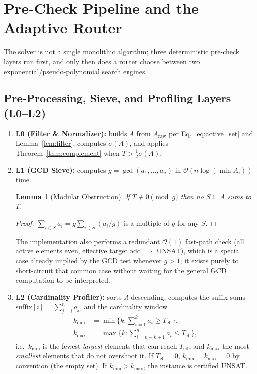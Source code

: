 \documentclass[journal,onecolumn,11pt]{IEEEtran}
\newtheorem{lemma}{Lemma}
\begin{document}
\section{Pre-Check Pipeline and the Adaptive Router}
\label{sec:architecture}

The solver is not a single monolithic algorithm; three deterministic pre-check layers run first, and only then does a router choose between two exponential/pseudo-polynomial search engines.

\subsection{Pre-Processing, Sieve, and Profiling Layers (L0--L2)}
\begin{enumerate}
    \item \textbf{L0 (Filter \& Normalizer):} builds $A$ from $A_{\text{raw}}$ per Eq.~\eqref{eq:active_set} and Lemma~\ref{lem:filter}, computes $\sigma(A)$, and applies Theorem~\ref{thm:complement} when $T > \tfrac12\sigma(A)$.
    \item \textbf{L1 (GCD Sieve):} computes $g=\gcd(a_1,\dots,a_n)$ in $\mathcal{O}(n\log(\min A_i))$ time.
    \begin{lemma}[Modular Obstruction]
    If $T \not\equiv 0 \pmod g$ then no $S \subseteq A$ sums to $T$.
    \end{lemma}
    \begin{proof}
    $\sum_{i\in S} a_i = g\sum_{i\in S}(a_i/g)$ is a multiple of $g$ for any $S$.
    \end{proof}
    The implementation also performs a redundant $\mathcal{O}(1)$ fast-path check (all active elements even, effective target odd $\Rightarrow$ UNSAT), which is a special case already implied by the GCD test whenever $g>1$; it exists purely to short-circuit that common case without waiting for the general GCD computation to be interpreted.
    \item \textbf{L2 (Cardinality Profiler):} sorts $A$ descending, computes the suffix sums $\text{suffix}[i]=\sum_{j=i}^{n} a_j$, and the cardinality window
    \begin{align}
        k_{\min} &= \min\Big\{k : \textstyle\sum_{i=1}^k a_i \ge T_{\text{eff}}\Big\}, \\
        k_{\max} &= \max\Big\{k : \textstyle\sum_{i=n-k+1}^n a_i \le T_{\text{eff}}\Big\},
    \end{align}
    i.e.\ $k_{\min}$ is the fewest \emph{largest} elements that can reach $T_{\text{eff}}$, and $k_{\max}$ the most \emph{smallest} elements that do not overshoot it. If $T_{\text{eff}}=0$, $k_{\min}=k_{\max}=0$ by convention (the empty set). If $k_{\min}>k_{\max}$, the instance is certified UNSAT.
\end{enumerate}
\end{document}
